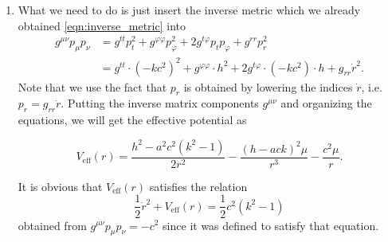 \documentclass[a4paper,pdftex,10pt]{article}
\begin{document}
\begin{enumerate}
  \item

        What we need to do is just insert the inverse metric which we already obtained \eqref{eqn:inverse_metric} into
        \begin{align}
          g^{\mu\nu}p_{\mu}p_{\nu}
           & =
          g^{tt}p_{t}^2
          +
          g^{\varphi\varphi}p_{\varphi}^2
          +
          2g^{t\varphi}p_{t}p_{\varphi}
          +
          g^{rr}p_{r}^2
          \nonumber
          \\
           & =
          g^{tt}\cdot(-kc^2)^2
          +
          g^{\varphi\varphi}\cdot h^2
          +
          2g^{t\varphi}\cdot(-kc^2)\cdot h
          +
          g_{rr}\dot{r}^2
          .
        \end{align}
        Note that we use the fact that $p_{r}$ is obtained by lowering the indices $\dot{r}$, i.e. $p_{r}=g_{rr}\dot{r}$. Putting the inverse matrix components $g^{\mu\nu}$ and organizing the equations, we will get the effective potential as
        \begin{graybox}
          \begin{equation}
            V_{\mathrm{eff}}(r)
            =
            \frac{h^2-a^2c^2(k^2-1)}{2r^2}
            -
            \frac{(h-ack)^2\mu}{r^3}
            -
            \frac{c^2\mu}{r}
            .
          \end{equation}
        \end{graybox}
        It is obvious that $V_{\mathrm{eff}}(r)$ satisfies the relation
        \begin{equation}
          \frac{1}{2}\dot{r}^2
          +
          V_{\mathrm{eff}}(r)
          =
          \frac{1}{2}c^2(k^2-1)
        \end{equation}
        obtained from $g^{\mu\nu}p_{\mu}p_{\nu}=-c^2$ since it was defined to satisfy that equation.



\end{enumerate}
\end{document}
